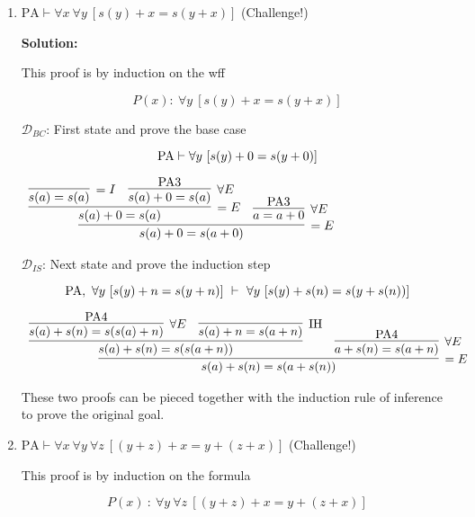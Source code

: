 \documentclass[11pt]{report}
\begin{document}
\begin{enumerate}
\begin{enumerate}
		\newpage
		\item $\text{PA} \vdash \forall x \ \forall y \ [s(y) + x = s(y+x)]$ \hfill (Challenge!)

		{\bf Solution:} 

		This proof is by induction on the wff 

		$$ P(x) : \ \forall y \ [s(y) + x = s(y+x)]$$

		$\mathcal{D}_{BC}$: First state and prove the base case 

		$$ \text{PA} \vdash \forall y \ [s(y) + 0 = s(y+0)]$$

		\begin{mdframed}
			\begin{center}
				$\begin{array}{c}
					\infer[=E]{s(a) + 0 = s(a + 0)}
						{\infer[=E]{s(a) + 0 = s(a)}
							{\infer[=I]{s(a)=s(a)}{}
							&
							\infer[\forall E]{s(a)+0=s(a)}{\PA 3}}
						&
						\infer[\forall E]{a = a + 0}{\PA 3}}
				\end{array}$
			\end{center}
		\end{mdframed}

		$\mathcal{D}_{IS}$: Next state and prove the induction step

		$$ \PA, \ \forall y \ [s(y) + n = s(y+n)] \ \vdash \ \forall y \ [s(y) + s(n) = s(y+s(n))]$$

		\begin{mdframed}
			\begin{center}
				\footnotesize{$\begin{array}{c}
					\infer[=E]{s(a)+s(n) = s(a + s(n))}
						{\infer[]{s(a)+s(n)=s(s(a+n))}
							{\infer[\forall E]{s(a)+s(n)=s(s(a)+n)}{\PA 4}
							&
							\infer[\IH]{s(a) + n = s(a+n)}{}}
						&
						\infer[\forall E]{a + s(n) = s(a + n)}{\PA 4}}
				\end{array}$}
			\end{center}
		\end{mdframed}
		
		These two proofs can be pieced together with the induction rule of inference to prove the original goal. 
		
		\newpage
		\item $\text{PA} \vdash \forall x \ \forall y \ \forall z \ [(y + z) + x = y + (z + x)]$ \hfill (Challenge!)
		
		This proof is by induction on the formula 
		
		$$P(x)  \ : \ \forall y \ \forall z \ [(y + z) + x = y + (z + x)] $$
		

\end{enumerate}
\end{enumerate}
\end{document}
